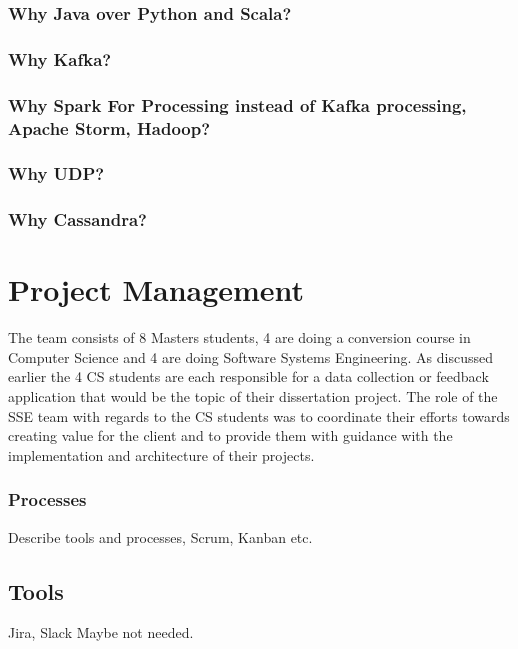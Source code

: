 \documentclass[prodmode,acmtosem]{acmsmall} %
\begin{document}
\subsubsection{Why Java over Python and Scala?}



\subsubsection{Why Kafka?}


\subsubsection{Why Spark For Processing instead of Kafka processing, Apache Storm, Hadoop?}


\subsubsection{Why UDP?}


\subsubsection{Why Cassandra?}



\section{Project Management}
The team consists of 8 Masters students, 4 are doing a conversion course in Computer Science and 4 are doing Software Systems Engineering. As discussed earlier the 4 CS students are each responsible for a data collection or feedback application that would be the topic of their dissertation project.
The role of the SSE team with regards to the CS students was to coordinate their efforts towards creating value for the client and to provide them with guidance with the implementation and architecture of their projects.

\subsubsection{Processes}
Describe tools and processes, Scrum, Kanban etc.

\subsection{Tools}
Jira, Slack Maybe not needed.
\end{document}
